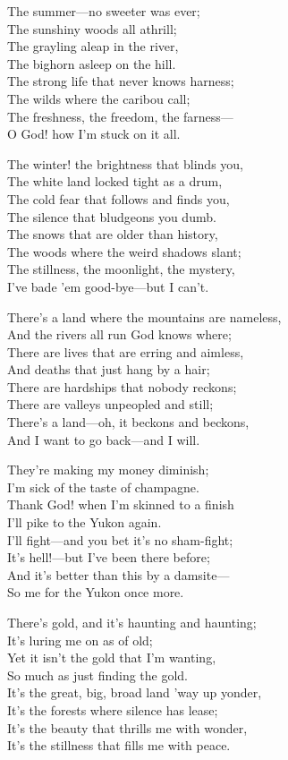 \begin{poemblock}
The summer—no sweeter was ever;\\
\idt The sunshiny woods all athrill;\\
The grayling aleap in the river,\\
\idt The bighorn asleep on the hill.\\
The strong life that never knows harness;\\
\idt The wilds where the caribou call;\\
The freshness, the freedom, the farness—\\
\idt O God! how I'm stuck on it all.

The winter! the brightness that blinds you,\\
\idt The white land locked tight as a drum,\\
The cold fear that follows and finds you,\\
\idt The silence that bludgeons you dumb.\\
The snows that are older than history,\\
\idt The woods where the weird shadows slant;\\
The stillness, the moonlight, the mystery,\\
\idt I've bade 'em good-bye—but I can't.

There's a land where the mountains are nameless,\\
\idt And the rivers all run God knows where;\\
There are lives that are erring and aimless,\\
\idt And deaths that just hang by a hair;\\
There are hardships that nobody reckons;\\
\idt There are valleys unpeopled and still;\\
There's a land—oh, it beckons and beckons,\\
\idt And I want to go back—and I will.

They're making my money diminish;\\
\idt I'm sick of the taste of champagne.\\
Thank God! when I'm skinned to a finish\\
\idt I'll pike to the Yukon again.\\
I'll fight—and you bet it's no sham-fight;\\
\idt It's hell!—but I've been there before;\\
And it's better than this by a damsite—\\
\idt So me for the Yukon once more.

There's gold, and it's haunting and haunting;\\
\idt It's luring me on as of old;\\
Yet it isn't the gold that I'm wanting,\\
\idt So much as just finding the gold.\\
It's the great, big, broad land 'way up yonder,\\
\idt It's the forests where silence has lease;\\
It's the beauty that thrills me with wonder,\\
\idt It's the stillness that fills me with peace.

\end{poemblock}
